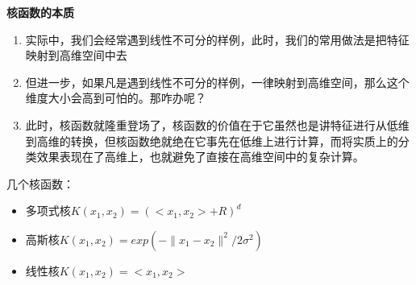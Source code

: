 \textbf{核函数的本质}
\begin{enumerate}
	\item 实际中，我们会经常遇到线性不可分的样例，此时，我们的常用做法是把特征映射到高维空间中去
	\item 但进一步，如果凡是遇到线性不可分的样例，一律映射到高维空间，那么这个维度大小会高到可怕的。那咋办呢？
	\item 此时，核函数就隆重登场了，核函数的价值在于它虽然也是讲特征进行从低维到高维的转换，但核函数绝就绝在它事先在低维上进行计算，而将实质上的分类效果表现在了高维上，也就避免了直接在高维空间中的复杂计算。
\end{enumerate}

几个核函数：
\begin{itemize}
	\item 多项式核$K(x_1,x_2) = (<x_1, x_2> + R)^d $
	\item 高斯核$K(x_1,x_2) = exp(-\lVert x_1 - x_2 \rVert ^2 / 2\sigma ^2)$
	\item 线性核$K(x_1,x_2) = <x_1, x_2> $
\end{itemize}

